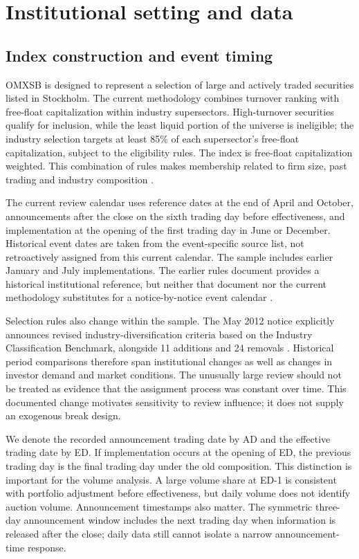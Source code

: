 \section{Institutional setting and data}
\subsection{Index construction and event timing}

OMXSB is designed to represent a selection of large and actively traded securities listed in Stockholm. The current methodology combines turnover ranking with free-float capitalization within industry supersectors. High-turnover securities qualify for inclusion, while the least liquid portion of the universe is ineligible; the industry selection targets at least 85\% of each supersector's free-float capitalization, subject to the eligibility rules. The index is free-float capitalization weighted. This combination of rules makes membership related to firm size, past trading and industry composition \citep{nasdaq2026}.

The current review calendar uses reference dates at the end of April and October, announcements after the close on the sixth trading day before effectiveness, and implementation at the opening of the first trading day in June or December. Historical event dates are taken from the event-specific source list, not retroactively assigned from this current calendar. The sample includes earlier January and July implementations. The earlier rules document provides a historical institutional reference, but neither that document nor the current methodology substitutes for a notice-by-notice event calendar \citep{nasdaq2013,nasdaq2026}.

Selection rules also change within the sample. The May 2012 notice explicitly announces revised industry-diversification criteria based on the Industry Classification Benchmark, alongside 11 additions and 24 removals \citep{nasdaq2012review}. Historical period comparisons therefore span institutional changes as well as changes in investor demand and market conditions. The unusually large review should not be treated as evidence that the assignment process was constant over time. This documented change motivates sensitivity to review influence; it does not supply an exogenous break design.

We denote the recorded announcement trading date by AD and the effective trading date by ED. If implementation occurs at the opening of ED, the previous trading day is the final trading day under the old composition. This distinction is important for the volume analysis. A large volume share at ED-1 is consistent with portfolio adjustment before effectiveness, but daily volume does not identify auction volume. Announcement timestamps also matter. The symmetric three-day announcement window includes the next trading day when information is released after the close; daily data still cannot isolate a narrow announcement-time response.

